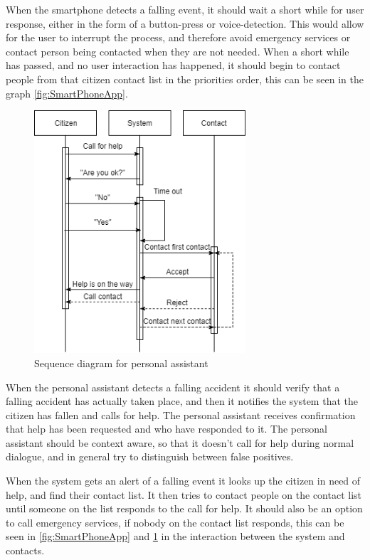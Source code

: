 When the smartphone detects a falling event, it should wait a short while for user response, either in the form of a button-press or voice-detection. This would allow for the user to interrupt the process, and therefore avoid emergency services or contact person being contacted when they are not needed. When a short while has passed, and no user interaction has happened, it should begin to contact people from that citizen contact list in the priorities order, this can be seen in the graph \ref{fig:SmartPhoneApp}.


\begin{figure}[H]
    \centering
    \includegraphics[width=0.7\textwidth]{Figures/PersonAssitent.png}
    \caption{Sequence diagram for personal assistant}
    \label{fig:PersonAssitent}
\end{figure}

When the personal assistant detects a falling accident it should verify that a falling accident has actually taken place, and then it notifies the system that the citizen has fallen and calls for help. The personal assistant receives confirmation that help has been requested and who have responded to it. The personal assistant should be context aware, so that it doesn't call for help during normal dialogue, and in general try to distinguish between false positives.

When the system gets an alert of a falling event it looks up the citizen in need of help, and find their contact list. It then tries to contact people on the contact list until someone on the list responds to the call for help. It should also be an option to call emergency services, if nobody on the contact list responds, this can be seen in \ref{fig:SmartPhoneApp} and \ref{fig:PersonAssitent} in the interaction between the system and contacts.

